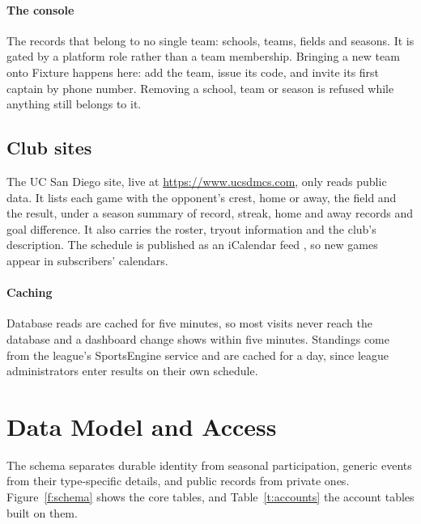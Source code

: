 \documentclass[letterpaper,11pt]{article}
\begin{document}
\paragraph{The console} The records that belong to no single team: schools, teams, fields and
seasons. It is gated by a platform role rather than a team membership. Bringing a new team onto
Fixture happens here: add the team, issue its code, and invite its first captain by phone number.
Removing a school, team or season is refused while anything still belongs to it.

\subsection{Club sites}

The UC San Diego site, live at \url{https://www.ucsdmcs.com}, only reads public data. It lists
each game with the opponent's crest, home or away, the field and the result, under a season
summary of record, streak, home and away records and goal difference. It also carries the roster,
tryout information and the club's description. The schedule is published as an iCalendar feed
\citep{RFC5545}, so new games appear in subscribers' calendars.

\paragraph{Caching} Database reads are cached for five minutes, so most visits never reach the
database and a dashboard change shows within five minutes. Standings come from the league's
SportsEngine service and are cached for a day, since league administrators enter results on their
own schedule.

\section{Data Model and Access}\label{s:data}

The schema separates durable identity from seasonal participation, generic events from their
type-specific details, and public records from private ones. Figure~\ref{f:schema} shows the core
tables, and Table~\ref{t:accounts} the account tables built on them.
\end{document}
